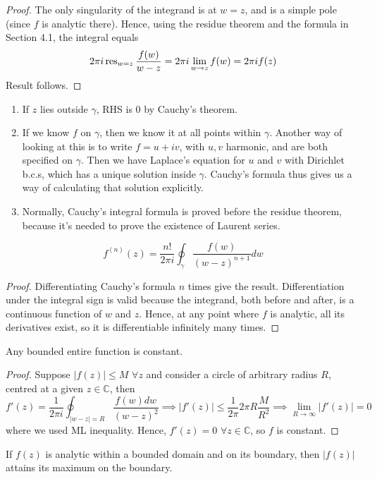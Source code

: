 \documentclass[a4paper]{article}
\begin{document}
\begin{proof}
 The only singularity of the integrand is at $w=z$, and is a simple pole (since $f$ is analytic there). Hence, using the residue theorem and the formula in Section 4.1, the integral equals 
$$2\pi i\operatorname{res}_{w=z}\frac{f(w)}{w-z}=2\pi i\lim_{w\rightarrow z}f(w)=2\pi if(z)$$
Result follows.
\end{proof}
\begin{remarks}\leavevmode
\begin{enumerate}
    \item If $z$ lies outside $\gamma$, RHS is 0 by Cauchy's theorem.
    \item If we know $f$ on $\gamma$, then we know it at all points within $\gamma$. Another way of looking at this is to write $f=u+iv$, with $u,v$ harmonic, and are both specified on $\gamma$. Then we have Laplace's equation for $u$ and $v$ with Dirichlet b.c.s, which has a unique solution inside $\gamma$. Cauchy's formula thus gives us a way of calculating that solution explicitly.
    \item Normally, Cauchy's integral formula is proved before the residue theorem, because it's needed to prove the existence of Laurent series.
\end{enumerate}
\end{remarks}
\begin{cor}
$$f^{(n)}(z)=\frac{n!}{2\pi i}\oint_\gamma\frac{f(w)}{(w-z)^{n+1}}dw$$
\end{cor}
\begin{proof}
Differentiating Cauchy's formula $n$ times give the result. Differentiation under the integral sign is valid because the integrand, both before and after, is a continuous function of $w$ and $z$. Hence, at any point where $f$ is analytic, all its derivatives exist, so it is differentiable infinitely many times.
\end{proof}
\begin{cor}
Any bounded entire function is constant.
\end{cor}
\begin{proof}
Suppose $|f(z)|\leq M$ $\forall z$ and consider a circle of arbitrary radius $R$, centred at a given $z\in\mathbb{C}$, then
$$f'(z)=\frac{1}{2\pi i}\oint_{|w-z|=R}\frac{f(w)dw}{(w-z)^2}\implies|f'(z)|\leq\frac{1}{2\pi}2\pi R\frac{M}{R^2}\implies\lim_{R\rightarrow\infty}|f'(z)|=0$$
where we used ML inequality. Hence, $f'(z)=0$ $\forall z\in\mathbb{C}$, so $f$ is constant.
\end{proof}
\begin{cor}
If $f(z)$ is analytic within a bounded domain and on its boundary, then $|f(z)|$ attains its maximum on the boundary.
\end{cor}
\end{document}
